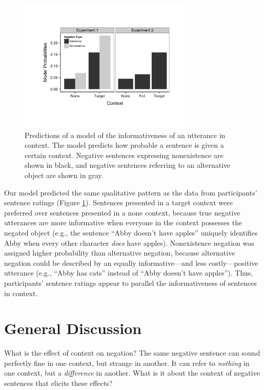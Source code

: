\documentclass[10pt,letterpaper]{article}
\begin{document}
\begin{figure}[t]
\begin{center} 
\includegraphics[width=3.25in]{figures/model_predictions.pdf}
\caption{\label{fig:model} Predictions of a model of the informativeness of an utterance in context.  The model predicts how probable a sentence is given a certain context.  Negative sentences expressing nonexistence are shown in black, and negative sentences referring to an alternative object are shown in gray.}
\end{center} 
\end{figure}

Our model predicted the same qualitative pattern as the data from participants' sentence ratings (Figure \ref{fig:model}).  Sentences presented in a target context were preferred over sentences presented in a none context, because true negative utterances are more informative when everyone in the context possesses the negated object (e.g., the sentence ``Abby doesn't have apples'' uniquely identifies Abby when every other character \emph{does} have apples).  Nonexistence negation was assigned higher probability than alternative negation, because alternative negation could be described by an equally informative---and less costly---positive utterance (e.g., ``Abby has cats'' instead of ``Abby doesn't have apples'').  Thus, participants' sentence ratings appear to parallel the informativeness of sentences in context.  

\section{General Discussion}

What is the effect of context on negation?  The same negative sentence can sound perfectly fine in one context, but strange in another.  It can refer to \emph{nothing} in one context, but a \emph{difference} in another.  What is it about the context of negative sentences that elicits these effects?  
\end{document}

